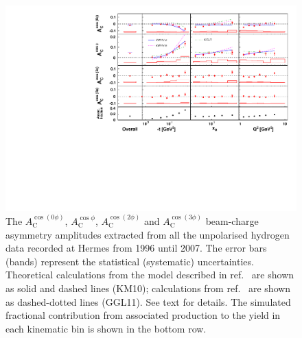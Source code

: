 \documentclass[11pt,a4paper]{article}
\begin{document}
\begin{figure}
  \begin{center}
    \includegraphics[width=15cm]{bca_comb}
    \caption{The $A_{\textrm{C}}^{\cos(0\phi)}$, $A_{\textrm{C}}^{\cos\phi}$, $A_{\textrm{C}}^{\cos(2\phi)}$ and $A_{\textrm{C}}^{\cos(3\phi)}$ beam-charge asymmetry amplitudes extracted from all the unpolarised hydrogen data recorded at H{\sc ermes} from 1996 until 2007. The error bars (bands) represent the statistical (systematic) uncertainties.  Theoretical calculations from the model described in ref.~\cite{Kum09} are shown as solid and dashed lines (KM10); calculations from ref.~\cite{Liu11} are shown as dashed-dotted lines (GGL11). See text for details. The simulated fractional contribution from associated production to the yield in each kinematic bin is shown in the bottom row.}
  \label{bca_xbjrange}
 \end{center}
\end{figure}
\end{document}
